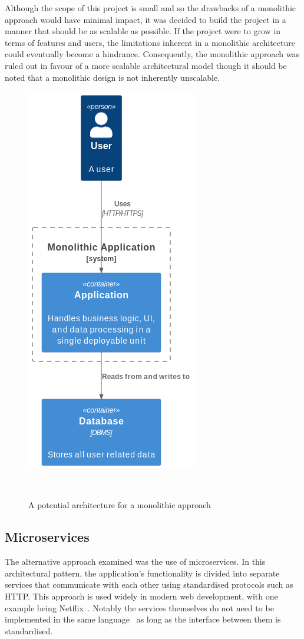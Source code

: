 Although the scope of this project is small and so the drawbacks of a monolithic approach would have minimal impact, it was decided to build the project in a manner that should be as scalable as possible. If the project were to grow in terms of features and users, the limitations inherent in a monolithic architecture could eventually become a hindrance. Consequently, the monolithic approach was ruled out in favour of a more scalable architectural model though it should be noted that a monolithic design is not inherently unscalable.

\begin{figure} [H]
    \centering
    \includegraphics[width=0.35\linewidth]{figures/monolithic_arch.png}
    \caption{A potential architecture for a monolithic approach}
~\label{fig:monolith-arch}
\end{figure}

\subsection{Microservices}
The alternative approach examined was the use of microservices. In this architectural pattern, the application's functionality is divided into separate services that communicate with each other using standardised protocols such as HTTP. This approach is used widely in modern web development, with one example being Netflix~\cite{NetflixMicroservices}. Notably the services themselves do not need to be implemented in the same language~\cite{7030212} as long as the interface between them is standardised.


